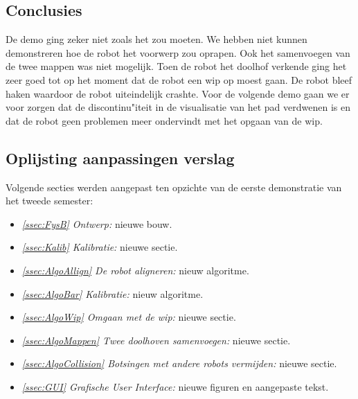 \documentclass[tt3]{penoverslag}
\begin{document}
\subsection{Conclusies}
\label{Assec:conc2}
De demo ging zeker niet zoals het zou moeten. We hebben niet kunnen demonstreren hoe de robot het voorwerp zou oprapen. Ook het samenvoegen van de twee mappen was niet mogelijk. Toen de robot het doolhof verkende ging het zeer goed tot op het moment dat de robot een wip op moest gaan. De robot bleef haken waardoor de robot uiteindelijk crashte. Voor de volgende demo gaan we er voor zorgen dat de discontinu"iteit in de visualisatie van het pad verdwenen is en dat de robot geen problemen meer ondervindt met het opgaan van de wip.


\subsection{Oplijsting aanpassingen verslag}
\label{Assec:aanp2}
Volgende secties werden aangepast ten opzichte van de eerste demonstratie van het tweede semester:

\begin{itemize}
\item \textit{\ref{ssec:FysB} Ontwerp:} nieuwe bouw.
\item \textit{\ref{ssec:Kalib} Kalibratie:} nieuwe sectie.
\item \textit{\ref{ssec:AlgoAllign} De robot aligneren:} nieuw algoritme.
\item \textit{\ref{ssec:AlgoBar} Kalibratie:} nieuw algoritme.
\item \textit{\ref{ssec:AlgoWip} Omgaan met de wip:} nieuwe sectie.
\item \textit{\ref{ssec:AlgoMappen} Twee doolhoven samenvoegen:} nieuwe sectie.
\item \textit{\ref{ssec:AlgoCollision} Botsingen met andere robots vermijden:} nieuwe sectie.
\item \textit{\ref{ssec:GUI} Grafische User Interface:} nieuwe figuren en aangepaste tekst.
\end{itemize}
\end{document}
